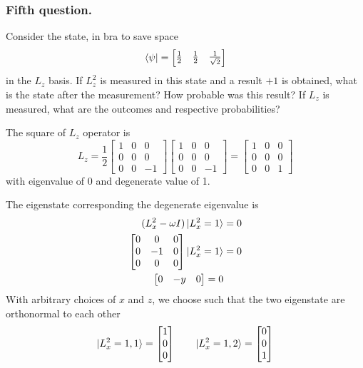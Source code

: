 \documentclass[../../../main.tex]{subfiles}
\begin{document}
\subsubsection{Fifth question.}
Consider the state, in bra to save space
\begin{equation*}
    \bra{\psi}=\begin{bmatrix}
        \frac{1 }{2} & \frac{1 }{2} & \frac{1 }{\sqrt{2}}
    \end{bmatrix}
\end{equation*}
in the $L_z$ basis.
If $L_z^2$ is measured in this state and a result $+1$ is obtained, what is the state after the measurement?
How probable was this result?
If $L_z$ is measured, what are the outcomes and respective probabilities?

The square of $L_z$ operator is
\begin{equation*}
    L_z=\frac{1 }{2}
    \begin{bmatrix}
        1 & 0 & 0  \\
        0 & 0 & 0  \\
        0 & 0 & -1
    \end{bmatrix}
    \begin{bmatrix}
        1 & 0 & 0  \\
        0 & 0 & 0  \\
        0 & 0 & -1
    \end{bmatrix}
    =
    \begin{bmatrix}
        1 & 0 & 0 \\
        0 & 0 & 0 \\
        0 & 0 & 1
    \end{bmatrix}
\end{equation*}
with eigenvalue of 0 and degenerate value of 1.

The eigenstate corresponding the degenerate eigenvalue is
\begin{align*}
    (L_x^2-\omega I)\ket{L_x^2=1} & = 0 \\
    \begin{bmatrix}
        0 & 0  & 0 \\
        0 & -1 & 0 \\
        0 & 0  & 0
    \end{bmatrix}
    \ket{L_x^2=1}                 & = 0 \\
    \begin{bmatrix}
        0 & -y & 0
    \end{bmatrix}
    =0
\end{align*}
With arbitrary choices of $x$ and $z$, we choose such that the two eigenstate are orthonormal to each other
\begin{equation*}
    \ket{L_x^2=1,1}=
    \begin{bmatrix}
        1 \\0\\0
    \end{bmatrix}\qquad
    \ket{L_x^2=1,2}=
    \begin{bmatrix}
        0 \\0\\1
    \end{bmatrix}
\end{equation*}
\end{document}
